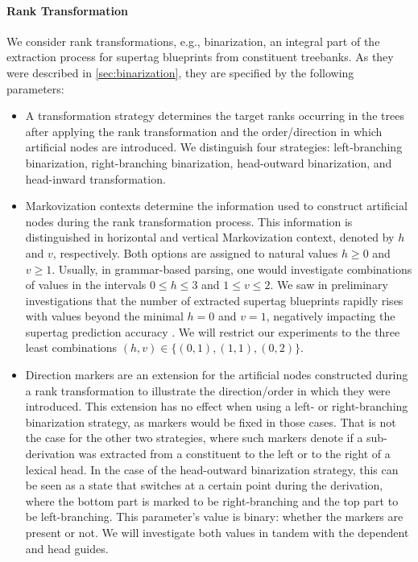 \documentclass[../../document.tex]{subfiles}
\begin{document}
    \paragraph*{Rank Transformation}
    We consider rank transformations, e.g.\@, binarization, an integral part of the extraction process for supertag blueprints from constituent treebanks.
    As they were described in \cref{sec:binarization}, they are specified by the following parameters:
    \begin{itemize}
        \item A transformation strategy determines the target ranks occurring in the trees after applying the rank transformation and the order/direction in which artificial nodes are  introduced. We distinguish four strategies: left-branching binarization, right-branching binarization, head-outward binarization, and head-inward transformation.
        \item Markovization contexts determine the information used to construct artificial nodes during the rank transformation process. This information is distinguished in horizontal and vertical Markovization context, denoted by \(h\) and \(v\), respectively. Both options are assigned to natural values \(h \ge 0\) and \(v \ge 1\). Usually, in grammar-based parsing, one would investigate combinations of values in the intervals \(0 \le h \le 3\) and \(1 \le v \le 2\). We saw in preliminary investigations that the number of extracted supertag blueprints rapidly rises with values beyond the minimal \(h = 0\) and \(v = 1\), negatively impacting the supertag prediction accuracy \citep{Rup22}. We will restrict our experiments to the three least combinations \((h, v) \in \{(0,1), (1,1), (0,2)\}\).
        \item Direction markers are an extension for the artificial nodes constructed during a rank transformation to illustrate the direction/order in which they were introduced. This extension has no effect when using a left- or right-branching binarization strategy, as markers would be fixed in those cases. That is not the case for the other two strategies, where such markers denote if a sub-derivation was extracted from a constituent to the left or to the right of a lexical head. In the case of the head-outward binarization strategy, this can be seen as a state that switches at a certain point during the derivation, where the bottom part is marked to be right-branching and the top part to be left-branching. This parameter's value is binary: whether the markers are present or not. We will investigate both values in tandem with the dependent and head guides.

\end{itemize}
\end{document}
